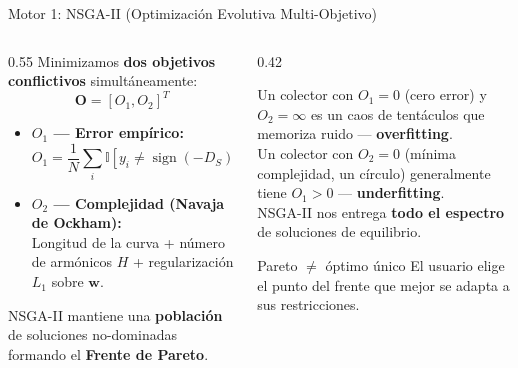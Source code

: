 \documentclass[aspectratio=169,10pt]{beamer}
\begin{document}
\begin{frame}{Motor 1: NSGA-II (Optimización Evolutiva Multi-Objetivo)}
  \begin{columns}[T]
    \begin{column}{0.55\textwidth}
      Minimizamos \textbf{dos objetivos conflictivos} simultáneamente:
      \[
        \mathbf{O} = [O_1, O_2]^T
      \]
      \begin{itemize}
        \item \textbf{$O_1$ — Error empírico:}
        \[
          O_1 = \frac{1}{N}\sum_i \mathbb{I}[y_i \neq \operatorname{sign}(-D_S)]
        \]
        \item \textbf{$O_2$ — Complejidad (Navaja de Ockham):}\\
        Longitud de la curva + número de armónicos $H$ + regularización $L_1$ sobre $\mathbf{w}$.
      \end{itemize}
      \vspace{6pt}
      NSGA-II mantiene una \textbf{población} de soluciones no-dominadas formando el \textbf{Frente de Pareto}.
    \end{column}
    \begin{column}{0.42\textwidth}
      \begin{tcolorbox}[myex={¿Por qué dos objetivos?}]
        {\small Un colector con $O_1=0$ (cero error) y $O_2=\infty$ es un caos de tentáculos que memoriza ruido — \textbf{overfitting}.\\[4pt]
        Un colector con $O_2=0$ (mínima complejidad, un círculo) generalmente tiene $O_1 > 0$ — \textbf{underfitting}.\\[4pt]
        NSGA-II nos entrega \textbf{todo el espectro} de soluciones de equilibrio.}
      \end{tcolorbox}
      \begin{alertblock}{Pareto $\neq$ óptimo único}
        El usuario elige el punto del frente que mejor se adapta a sus restricciones.
      \end{alertblock}
    \end{column}
  \end{columns}
\end{frame}
\end{document}
